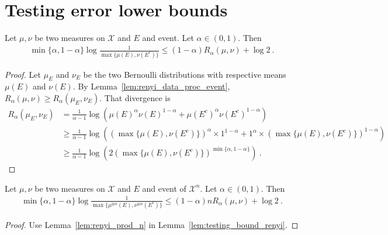 \chapter{Testing error lower bounds}

\begin{lemma}
  \label{lem:testing_bound_renyi}
  Let $\mu, \nu$ be two measures on $\mathcal X$ and $E$ and event. Let $\alpha \in (0,1)$. Then
  \begin{align*}
  \min\{\alpha, 1 - \alpha\} \log\frac{1}{\max\{\mu(E), \nu(E^c)\}} \le (1 - \alpha) R_{\alpha}(\mu, \nu)  + \log 2 \: .
  \end{align*}
\end{lemma}

\begin{proof}
Let $\mu_E$ and $\nu_E$ be the two Bernoulli distributions with respective means $\mu(E)$ and $\nu(E)$.
By Lemma~\ref{lem:renyi_data_proc_event}, $R_\alpha(\mu, \nu) \ge R_\alpha(\mu_E, \nu_E)$. That divergence is
\begin{align*}
R_\alpha(\mu_E, \nu_E)
&= \frac{1}{\alpha - 1}\log \left(\mu(E)^\alpha \nu(E)^{1 - \alpha}
	+ \mu(E^c)^\alpha \nu(E^c)^{1 - \alpha}\right)
\\
&\ge \frac{1}{\alpha - 1}\log \left((\max\{\mu(E), \nu(E^c)\})^\alpha \times 1^{1 - \alpha}
	+ 1^\alpha \times (\max\{\mu(E), \nu(E^c)\})^{1 - \alpha}\right)
\\
&\ge \frac{1}{\alpha - 1}\log \left(2 (\max\{\mu(E), \nu(E^c)\})^{\min\{\alpha, 1-\alpha\}}\right) \: .
\end{align*}
\end{proof}

\begin{corollary}
  \label{cor:testing_bound_renyi_n}
  Let $\mu, \nu$ be two measures on $\mathcal X$ and $E$ and event of $\mathcal X^n$. Let $\alpha \in (0,1)$. Then
  \begin{align*}
  \min\{\alpha, 1 - \alpha\} \log\frac{1}{\max\{\mu^{\otimes n}(E), \nu^{\otimes n}(E^c)\}} \le (1 - \alpha) n R_{\alpha}(\mu, \nu)  + \log 2 \: .
  \end{align*}
\end{corollary}

\begin{proof}
Use Lemma~\ref{lem:renyi_prod_n} in Lemma~\ref{lem:testing_bound_renyi}.
\end{proof}